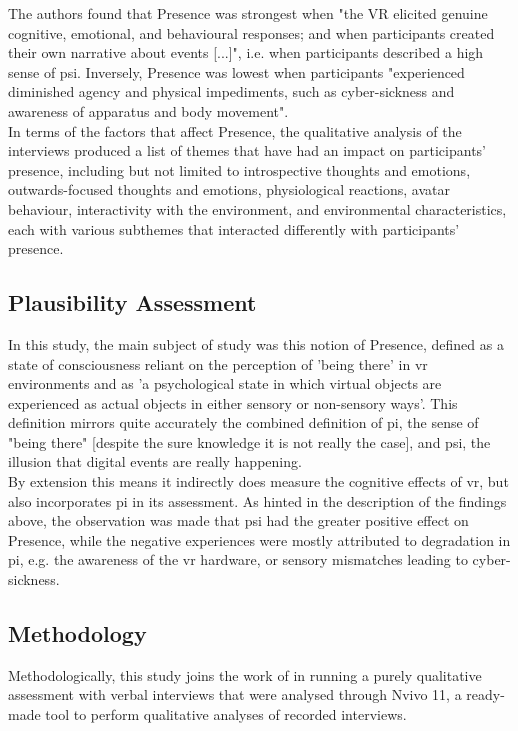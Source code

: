 The authors found that Presence was strongest when "the VR elicited genuine cognitive, emotional, and behavioural responses; and when participants created their own narrative about events [...]", i.e. when participants described a high sense of \gls{psi}. Inversely, Presence was lowest when participants "experienced diminished agency and physical impediments, such as cyber-sickness and awareness of apparatus and body movement".\\

In terms of the factors that affect Presence, the qualitative analysis of the interviews produced a list of themes that have had an impact on participants' presence, including but not limited to introspective thoughts and emotions, outwards-focused thoughts and emotions, physiological reactions, avatar behaviour, interactivity with the environment, and environmental characteristics, each with various subthemes that interacted differently with participants' presence.

\subsection{Plausibility Assessment}

In this study, the main subject of study was this notion of Presence, defined as a state of consciousness reliant on the perception of 'being there' in \gls{vr} environments and as 'a psychological state in which virtual objects are experienced as actual objects in either sensory or non-sensory ways'. This definition mirrors quite accurately the combined definition of \gls{pi}, the sense of "being there" [despite the sure knowledge it is not really the case], and \gls{psi}, the illusion that digital events are really happening.\\

By extension this means it indirectly does measure the cognitive effects of \gls{vr}, but also incorporates \gls{pi} in its assessment. As hinted in the description of the findings above, the observation was made that \gls{psi} had the greater positive effect on Presence, while the negative experiences were mostly attributed to degradation in \gls{pi}, e.g. the awareness of the \gls{vr} hardware, or sensory mismatches leading to cyber-sickness.

\subsection{Methodology}

Methodologically, this study joins the work of \cite{slater-2023-sentiment} in running a purely qualitative assessment with verbal interviews that were analysed through Nvivo 11, a ready-made tool to perform qualitative analyses of recorded interviews.\\


